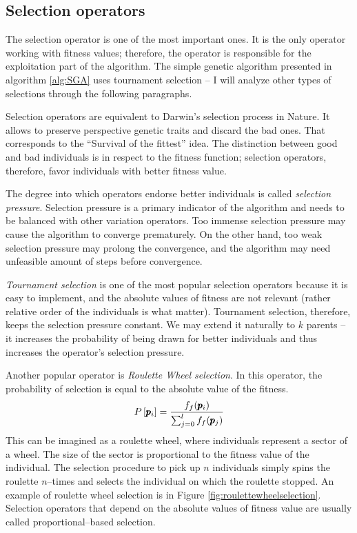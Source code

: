 \subsection{Selection operators}

The selection operator is one of the most important ones. It is the only operator working with fitness values; therefore, the operator is responsible for the exploitation part of the algorithm. The simple genetic algorithm presented in algorithm \ref{alg:SGA} uses tournament selection -- I will analyze other types of selections through the following paragraphs.

Selection operators are equivalent to Darwin's selection process in Nature. It allows to preserve perspective genetic traits and discard the bad ones. That corresponds to the \enquote{Survival of the fittest} idea. The distinction between good and bad individuals is in respect to the fitness function; selection operators, therefore, favor individuals with better fitness value.

The degree into which operators endorse better individuals is called \emph{selection pressure}. Selection pressure is a primary indicator of the algorithm and needs to be balanced with other variation operators. Too immense selection pressure may cause the algorithm to converge prematurely. On the other hand, too weak selection pressure may prolong the convergence, and the algorithm may need unfeasible amount of steps before convergence.

\emph{Tournament selection} is one of the most popular selection operators because it is easy to implement, and the absolute values of fitness are not relevant (rather relative order of the individuals is what matter). Tournament selection, therefore, keeps the selection pressure constant. We may extend it naturally to $k$ parents -- it increases the probability of being drawn for better individuals and thus increases the operator's selection pressure.

Another popular operator is \emph{Roulette Wheel selection}. In this operator, the probability of selection is equal to the absolute value of the fitness.
$$ P\left[\pmb{p}_i\right] = \frac{f_f(\pmb{p}_i)}{\sum_{j=0}^{l}f_f(\pmb{p}_j)} $$
This can be imagined as a roulette wheel, where individuals represent a sector of a wheel. The size of the sector is proportional to the fitness value of the individual. The selection procedure to pick up $n$ individuals simply spins the roulette $n$--times and selects the individual on which the roulette stopped. An example of roulette wheel selection is in Figure \ref{fig:roulettewheelselection}. Selection operators that depend on the absolute values of fitness value are usually called proportional--based selection.

